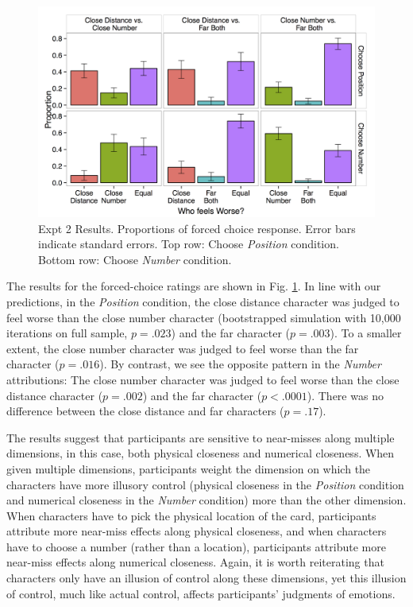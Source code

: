 \documentclass[10pt,letterpaper]{article}
\begin{document}
\begin{figure}[htb!]
\includegraphics[width=\columnwidth]{images/cardCombined_forcedWorse.png}
\caption{ Expt 2 Results. Proportions of forced choice response. Error bars indicate standard errors. Top row: Choose \textit{Position} condition. Bottom row: Choose \textit{Number} condition.}
\label{Expt2ResultFig}
\end{figure}


The results for the forced-choice ratings are shown in Fig. \ref{Expt2ResultFig}. In line with our predictions, in the \textit{Position} condition, the close distance character was judged to feel worse than the close number character (bootstrapped simulation with 10,000 iterations on full sample, $p=.023$) and the far character ($p=.003$). To a smaller extent, the close number character was judged to feel worse than the far character ($p=.016$). By contrast, we see the opposite pattern in the \textit{Number} attributions: The close number character was judged to feel worse than the close distance character ($p=.002$) and the far character ($p<.0001$). There was no difference between the close distance and far characters ($p=.17$). 


The results suggest that participants are sensitive to near-misses along multiple dimensions, in this case, both physical closeness and numerical closeness. When given multiple dimensions, participants weight the dimension on which the characters have more illusory control (physical closeness in the \textit{Position} condition and numerical closeness in the \textit{Number} condition) more than the other dimension. When characters have to pick the physical location of the card, participants attribute more near-miss effects along physical closeness, and when characters have to choose a number (rather than a location), participants attribute more near-miss effects along numerical closeness. Again, it is worth reiterating that characters only have an illusion of control along these dimensions, yet this illusion of control, much like actual control, affects participants' judgments of emotions.
\end{document}
